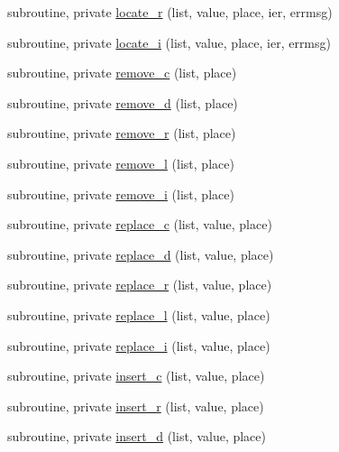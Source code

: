 \begin{DoxyCompactItemize}
\item 
subroutine, private \mbox{\hyperlink{namespacem__cli_ac44389e115b536069f324bffea7d2469}{locate\+\_\+r}} (list, value, place, ier, errmsg)
\item 
subroutine, private \mbox{\hyperlink{namespacem__cli_a36665ab0ea5080c14c8c9e52ed07d397}{locate\+\_\+i}} (list, value, place, ier, errmsg)
\item 
subroutine, private \mbox{\hyperlink{namespacem__cli_a05f549b10f50798d68003b8fd2a2d86a}{remove\+\_\+c}} (list, place)
\item 
subroutine, private \mbox{\hyperlink{namespacem__cli_abf22cbc2af66482f33b7bb1a210d9d99}{remove\+\_\+d}} (list, place)
\item 
subroutine, private \mbox{\hyperlink{namespacem__cli_a4f47701695b95c88fa4927c04996ce0f}{remove\+\_\+r}} (list, place)
\item 
subroutine, private \mbox{\hyperlink{namespacem__cli_a9c86f0f52ce71f14e774fd21f0686cf6}{remove\+\_\+l}} (list, place)
\item 
subroutine, private \mbox{\hyperlink{namespacem__cli_afa08d3d87184a6dd68a124231e536c93}{remove\+\_\+i}} (list, place)
\item 
subroutine, private \mbox{\hyperlink{namespacem__cli_a785aa0016768b6dc2e27c29d5342c329}{replace\+\_\+c}} (list, value, place)
\item 
subroutine, private \mbox{\hyperlink{namespacem__cli_aa9b7d672cc9fb0bc79fd09a2870614f5}{replace\+\_\+d}} (list, value, place)
\item 
subroutine, private \mbox{\hyperlink{namespacem__cli_ab3b33abc8a6da174d3f27c2f2203038c}{replace\+\_\+r}} (list, value, place)
\item 
subroutine, private \mbox{\hyperlink{namespacem__cli_a89ed5c3b944f91d8135173206fbc7e07}{replace\+\_\+l}} (list, value, place)
\item 
subroutine, private \mbox{\hyperlink{namespacem__cli_ac609c48bb1f904235b8cbf8bea61473f}{replace\+\_\+i}} (list, value, place)
\item 
subroutine, private \mbox{\hyperlink{namespacem__cli_a9baf1cf0e20942fbde8c025ead5a30db}{insert\+\_\+c}} (list, value, place)
\item 
subroutine, private \mbox{\hyperlink{namespacem__cli_a4bfb90e14824f94017b1d4fcb39f0701}{insert\+\_\+r}} (list, value, place)
\item 
subroutine, private \mbox{\hyperlink{namespacem__cli_a030e31579a7968aea68d80db1e36ebfd}{insert\+\_\+d}} (list, value, place)
\item 

\end{DoxyCompactItemize}
